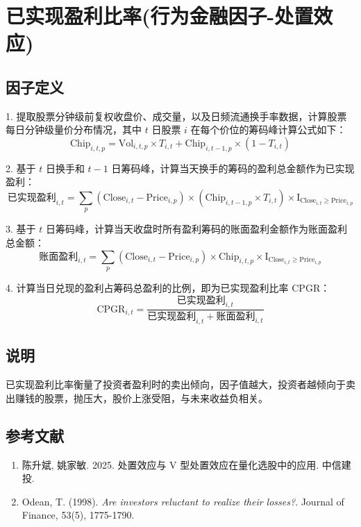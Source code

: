\documentclass{article}
\begin{document}
\section{已实现盈利比率(行为金融因子-处置效应)}

\subsection{因子定义}

1. 提取股票分钟级前复权收盘价、成交量，以及日频流通换手率数据，计算股票每日分钟级量价分布情况，其中 \( t \) 日股票 \( i \) 在每个价位的筹码峰计算公式如下：
\begin{equation}
    \mathrm{Chip}_{i,t,p} = \mathrm{Vol}_{i,t,p} \times T_{i,t} + \mathrm{Chip}_{i,t-1,p} \times (1 - T_{i,t})
\end{equation}

2. 基于 \( t \) 日换手和 \( t-1 \) 日筹码峰，计算当天换手的筹码的盈利总金额作为已实现盈利：
\begin{equation}
    \text{已实现盈利}_{i,t} = \sum_p (\mathrm{Close}_{i,t} - \mathrm{Price}_{i,p}) \times (\mathrm{Chip}_{i,t-1,p} \times T_{i,t}) \times \mathrm{I}_{\mathrm{Close}_{i,t} \geq \mathrm{Price}_{i,p}}
\end{equation}

3. 基于 \( t \) 日筹码峰，计算当天收盘时所有盈利筹码的账面盈利金额作为账面盈利总金额：
\begin{equation}
    \text{账面盈利}_{i,t} = \sum_p (\mathrm{Close}_{i,t} - \mathrm{Price}_{i,p}) \times \mathrm{Chip}_{i,t,p} \times \mathrm{I}_{\mathrm{Close}_{i,t} \geq \mathrm{Price}_{i,p}}
\end{equation}

4. 计算当日兑现的盈利占筹码总盈利的比例，即为已实现盈利比率 \( \mathrm{CPGR} \)：
\begin{equation}
    \mathrm{CPGR}_{i,t} = \frac{\text{已实现盈利}_{i,t}}{\text{已实现盈利}_{i,t} + \text{账面盈利}_{i,t}}
\end{equation}

\subsection{说明}
已实现盈利比率衡量了投资者盈利时的卖出倾向，因子值越大，投资者越倾向于卖出赚钱的股票，抛压大，股价上涨受阻，与未来收益负相关。

\subsection{参考文献}
\begin{enumerate}
    \item 陈升斌, 姚家敏. 2025. 处置效应与 V 型处置效应在量化选股中的应用. 中信建投.
    \item Odean, T. (1998). \textit{Are investors reluctant to realize their losses?}. Journal of Finance, 53(5), 1775-1790.
\end{enumerate}
\end{document}
